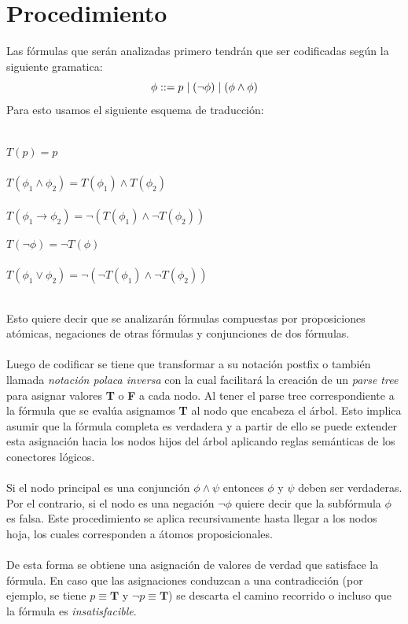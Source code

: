 \documentclass{report}
\begin{document}
	\section{Procedimiento}
	Las f\'ormulas que ser\'an analizadas primero tendr\'an que ser codificadas seg\'un la siguiente gramatica:
	\[ \phi ::= p \hspace{1mm}|\hspace{1mm} (\neg \phi)  \hspace{1mm}|\hspace{1mm} (\phi \land \phi) \]
	Para esto usamos el siguiente esquema de traducci\'on: \\\\
	\begin{minipage}[t]{0.45\textwidth}
		$ T(p)=p $ \\\\
		$ T(\phi_1 \land \phi_2)=T(\phi_1) \land T(\phi_2) $ \\\\
		$ T(\phi_1 \rightarrow \phi_2) = \neg(T(\phi_1) \land \neg T(\phi_2)) $
	\end{minipage}
	\hfill
	\begin{minipage}[t]{0.45\textwidth}
		$ T(\neg \phi) = \neg T(\phi) $ \\\\
		$ T(\phi_1 \lor \phi_2) = \neg(\neg T(\phi_1) \land \neg T(\phi_2)) $
	\end{minipage} \vspace*{5mm} \\ 
	Esto quiere decir que se analizar\'an f\'ormulas compuestas por proposiciones at\'omicas, negaciones de otras f\'ormulas y conjunciones de dos f\'ormulas.\\\\
	Luego de codificar se tiene que transformar a su notaci\'on postfix o tambi\'en llamada \textit{notaci\'on polaca inversa} con la cual facilitar\'a la creaci\'on de un \textit{parse tree} para asignar valores \textbf{T} o \textbf{F} a cada nodo. Al tener el parse tree correspondiente a la f\'ormula que se eval\'ua asignamos \textbf{T} al nodo que encabeza el \'arbol. Esto implica asumir que la f\'ormula completa es verdadera y a partir de ello se puede extender esta asignaci\'on hacia los nodos hijos del \'arbol aplicando reglas sem\'anticas de los conectores l\'ogicos. \\\\
	Si el nodo principal es una conjunci\'on $\phi \land \psi$ entonces $\phi$ y $\psi$ deben ser verdaderas. Por el contrario, si el nodo es una negaci\'on $\neg \phi$ quiere decir que la subf\'ormula $\phi$ es falsa. Este procedimiento se aplica recursivamente hasta llegar a los nodos hoja, los cuales corresponden a \'atomos proposicionales. \\\\
	De esta forma se obtiene una asignaci\'on de valores de verdad que satisface la f\'ormula. En caso que las asignaciones conduzcan a una contradicci\'on (por ejemplo, se tiene $p \equiv \textbf{T}$ y $\neg p\equiv \textbf{T}$) se descarta el camino recorrido o incluso que la f\'ormula es \textit{insatisfacible}.
\end{document}
